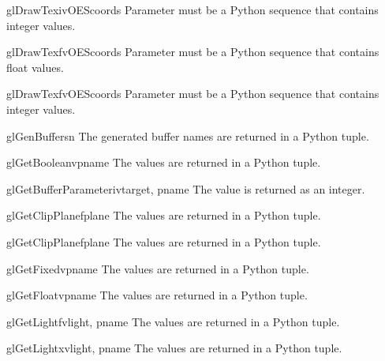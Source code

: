 \begin{funcdesc}{glDrawTexivOES}{coords}
Parameter  must be a Python sequence that contains integer
values. 
\end{funcdesc}

\begin{funcdesc}{glDrawTexfvOES}{coords}
Parameter  must be a Python sequence that contains float values.
\end{funcdesc}

\begin{funcdesc}{glDrawTexfvOES}{coords}
Parameter  must be a Python sequence that contains integer values.
\end{funcdesc}

\begin{funcdesc}{glGenBuffers}{n}
The generated buffer names are returned in a Python tuple.
\end{funcdesc}

\begin{funcdesc}{glGetBooleanv}{pname}
The values are returned in a Python tuple.
\end{funcdesc}

\begin{funcdesc}{glGetBufferParameteriv}{target, pname}
The value is returned as an integer.
\end{funcdesc}

\begin{funcdesc}{glGetClipPlanef}{plane}
The values are returned in a Python tuple.
\end{funcdesc}

\begin{funcdesc}{glGetClipPlanef}{plane}
The values are returned in a Python tuple.
\end{funcdesc}

\begin{funcdesc}{glGetFixedv}{pname}
The values are returned in a Python tuple.
\end{funcdesc}

\begin{funcdesc}{glGetFloatv}{pname}
The values are returned in a Python tuple.
\end{funcdesc}

\begin{funcdesc}{glGetLightfv}{light, pname}
The values are returned in a Python tuple.
\end{funcdesc}

\begin{funcdesc}{glGetLightxv}{light, pname}
The values are returned in a Python tuple.
\end{funcdesc}

